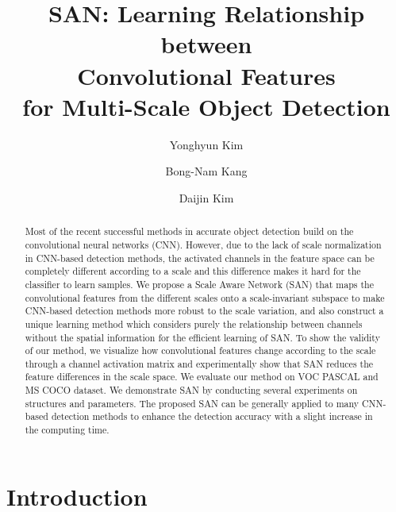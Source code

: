 \documentclass[runningheads]{llncs}
\newcommand{\etal}{\textit{et al.}}
\begin{document}
\title{SAN: Learning Relationship between \\ Convolutional Features \\for Multi-Scale Object Detection}

\author{Yonghyun Kim \and
	Bong-Nam Kang \and
	Daijin Kim}
\authorrunning{Y. Kim~\etal}

\maketitle              %
\begin{abstract}
	Most of the recent successful methods in accurate object detection build on the convolutional neural networks (CNN).
	However, due to the lack of scale normalization in CNN-based detection methods, the activated channels in the feature space can be completely different according to a scale and this difference makes it hard for the classifier to learn samples.
	We propose a Scale Aware Network (SAN) that maps the convolutional features from the different scales onto a scale-invariant subspace to make CNN-based detection methods more robust to the scale variation, and also construct a unique learning method which considers purely the relationship between channels without the spatial information for the efficient learning of SAN.
	To show the validity of our method, we visualize how convolutional features change according to the scale through a channel activation matrix and experimentally show that SAN reduces the feature differences in the scale space.
	We evaluate our method on VOC PASCAL and MS COCO dataset.
	We demonstrate SAN by conducting several experiments on structures and parameters.
	The proposed SAN can be generally applied to many CNN-based detection methods to enhance the detection accuracy with a slight increase in the computing time.
\end{abstract}
\section{Introduction}
\end{document}
